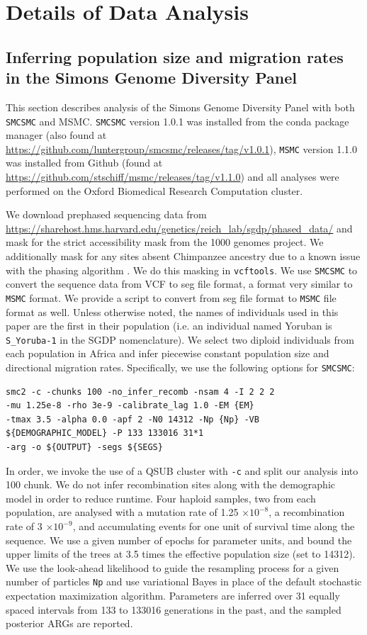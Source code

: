 \documentclass{article}
\begin{document}
\section{Details of Data Analysis}

\subsection{Inferring population size and migration rates in the Simons Genome Diversity Panel}

This section describes analysis of the Simons Genome Diversity Panel with both {\tt SMCSMC} and MSMC. {\tt SMCSMC} version 1.0.1 was installed from the conda package manager (also found at \url{https://github.com/luntergroup/smcsmc/releases/tag/v1.0.1}), {\tt MSMC} version 1.1.0 was installed from Github (found at \url{https://github.com/stschiff/msmc/releases/tag/v1.1.0}) and all analyses were performed on the Oxford Biomedical Research Computation cluster.

We download prephased sequencing data from \url{https://sharehost.hms.harvard.edu/genetics/reich_lab/sgdp/phased_data/} and mask for the strict accessibility mask from the 1000 genomes project. We additionally mask for any sites absent Chimpanzee ancestry due to a known issue with the phasing algorithm \cite{Wang2019a}. We do this masking in {\tt vcftools}. We use {\tt SMCSMC} to convert the sequence data from VCF to seg file format, a format very similar to {\tt MSMC} format. We provide a script to convert from seg file format to {\tt MSMC} file format as well. Unless otherwise noted, the names of individuals used in this paper are the first in their population (i.e. an individual named Yoruban is {\tt S\_Yoruba-1} in the SGDP nomenclature). We select two diploid individuals from each population in Africa  and infer piecewise constant population size and directional migration rates. Specifically, we use the following options for {\tt SMCSMC}:

\begin{verbatim}
smc2 -c -chunks 100 -no_infer_recomb -nsam 4 -I 2 2 2
-mu 1.25e-8 -rho 3e-9 -calibrate_lag 1.0 -EM {EM} 
-tmax 3.5 -alpha 0.0 -apf 2 -N0 14312 -Np {Np} -VB 
${DEMOGRAPHIC_MODEL} -P 133 133016 31*1 
-arg -o ${OUTPUT} -segs ${SEGS}
\end{verbatim}

In order, we invoke the use of a QSUB cluster with {\tt -c} and split our analysis into 100 chunk. We do not infer recombination sites along with the demographic model in order to reduce runtime. Four haploid samples, two from each population, are analysed with a mutation rate of 1.25 $\times 10^{-8}$, a recombination rate of 3 $\times 10^{-9}$, and accumulating events for one unit of survival time along the sequence. We use a given number of epochs for parameter units, and bound the upper limits of the trees at 3.5 times the effective population size (set to 14312). We use the look-ahead likelihood to guide the resampling process for a given number of particles {\tt Np} and use variational Bayes in place of the default stochastic expectation maximization algorithm. Parameters are inferred over 31 equally spaced intervals from 133 to 133016 generations in the past, and the sampled posterior ARGs are reported. 
\end{document}
